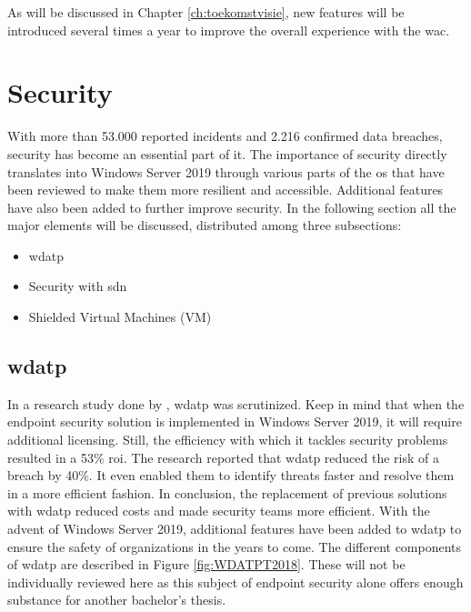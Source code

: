 As will be discussed in Chapter \ref{ch:toekomstvisie}, new features will be introduced several times a year to improve the overall experience with the \acrlong{wac}.

\clearpage

\section{Security}
With more than 53.000 reported incidents and 2.216 confirmed data breaches, security has become an essential part of \acrshort{it}. \autocite{Verizon2018}
The importance of security directly translates into Windows Server 2019 through various parts of the \acrshort{os} that have been reviewed to make them more resilient and accessible. Additional features have also been added to further improve security. 
In the following section all the major elements will be discussed, distributed among three subsections:
\begin{itemize}
	\item \acrfull{wdatp}
	\item Security with \acrfull{sdn}
	\item Shielded Virtual Machines (VM)
\end{itemize}

\subsection{\acrfull{wdatp}}
In a research study done by \textcite{Musto2017}, \acrshort{wdatp} was scrutinized. 
Keep in mind that when the endpoint security solution is implemented in Windows Server 2019, it will require additional licensing. 
Still, the efficiency with which it tackles security problems resulted in a 53\% \acrfull{roi}. 
The research reported that \acrshort{wdatp} reduced the risk of a breach by 40\%. 
It even enabled them to identify threats faster and resolve them in a more efficient fashion. 
In conclusion, the replacement of previous solutions with \acrshort{wdatp} reduced costs and made security teams more efficient. 
With the advent of Windows Server 2019, additional features have been added to \acrshort{wdatp} to ensure the safety of organizations in the years to come. 
The different components of \acrshort{wdatp} are described in Figure \ref{fig:WDATPT2018}. 
These will not be individually reviewed here as this subject of endpoint security alone offers enough substance for another bachelor's thesis.

